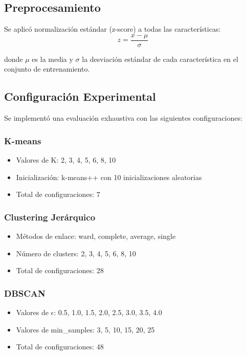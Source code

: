\documentclass[12pt,a4paper]{article}
\begin{document}
\subsection{Preprocesamiento}

Se aplicó normalización estándar (z-score) a todas las características:
\begin{equation}
z = \frac{x - \mu}{\sigma}
\end{equation}

donde $\mu$ es la media y $\sigma$ la desviación estándar de cada característica en el conjunto de entrenamiento.

\subsection{Configuración Experimental}

Se implementó una evaluación exhaustiva con las siguientes configuraciones:

\subsubsection{K-means}
\begin{itemize}
    \item Valores de K: 2, 3, 4, 5, 6, 8, 10
    \item Inicialización: k-means++ con 10 inicializaciones aleatorias
    \item Total de configuraciones: 7
\end{itemize}

\subsubsection{Clustering Jerárquico}
\begin{itemize}
    \item Métodos de enlace: ward, complete, average, single
    \item Número de clusters: 2, 3, 4, 5, 6, 8, 10
    \item Total de configuraciones: 28
\end{itemize}

\subsubsection{DBSCAN}
\begin{itemize}
    \item Valores de $\epsilon$: 0.5, 1.0, 1.5, 2.0, 2.5, 3.0, 3.5, 4.0
    \item Valores de min\_samples: 3, 5, 10, 15, 20, 25
    \item Total de configuraciones: 48
\end{itemize}
\end{document}
